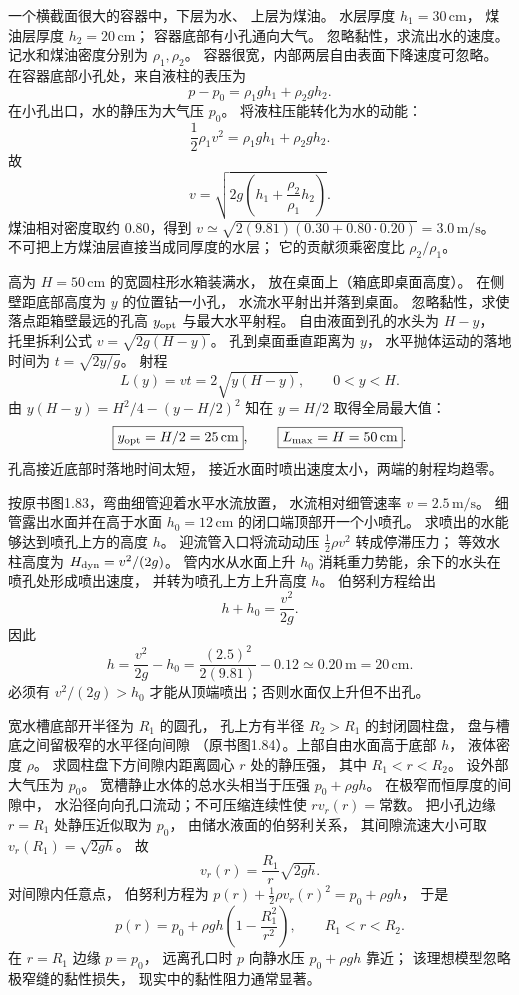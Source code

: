 一个横截面很大的容器中，下层为水、
上层为煤油。
水层厚度 $h_1=30\,\mathrm{cm}$，
煤油层厚度 $h_2=20\,\mathrm{cm}$；
容器底部有小孔通向大气。
忽略黏性，求流出水的速度。
\exsolution
记水和煤油密度分别为 $\rho_1,\rho_2$。
容器很宽，内部两层自由表面下降速度可忽略。
在容器底部小孔处，来自液柱的表压为
\[
p-p_0=\rho_1gh_1+\rho_2gh_2.
\]
在小孔出口，水的静压为大气压 $p_0$。
将液柱压能转化为水的动能：
\[
\frac12\rho_1v^2
=\rho_1gh_1+\rho_2gh_2.
\]
故
\[
\boxed{v=\sqrt{2g\left(
h_1+\frac{\rho_2}{\rho_1}h_2\right)}}.
\]
煤油相对密度取约 $0.80$，得到
$v\simeq\sqrt{2(9.81)(0.30+0.80\cdot0.20)}
=\boxed{3.0\,\mathrm{m/s}}$。
\excheck 不可把上方煤油层直接当成同厚度的水层；
它的贡献须乘密度比 $\rho_2/\rho_1$。

高为 $H=50\,\mathrm{cm}$ 的宽圆柱形水箱装满水，
放在桌面上（箱底即桌面高度）。
在侧壁距底部高度为 $y$ 的位置钻一小孔，
水流水平射出并落到桌面。
忽略黏性，求使落点距箱壁最远的孔高
$y_{\rm opt}$ 与最大水平射程。
\exsolution
自由液面到孔的水头为 $H-y$，
托里拆利公式
$v=\sqrt{2g(H-y)}$。
孔到桌面垂直距离为 $y$，
水平抛体运动的落地时间为
$t=\sqrt{2y/g}$。
射程
\[
L(y)=vt=2\sqrt{y(H-y)},\qquad 0<y<H.
\]
由
$y(H-y)=H^2/4-(y-H/2)^2$
知在 $y=H/2$ 取得全局最大值：
\[
\boxed{y_{\rm opt}=H/2=25\,\mathrm{cm}},\qquad
\boxed{L_{\max}=H=50\,\mathrm{cm}}.
\]
\excheck 孔高接近底部时落地时间太短，
接近水面时喷出速度太小，两端的射程均趋零。

按原书图1.83，弯曲细管迎着水平水流放置，
水流相对细管速率 $v=2.5\,\mathrm{m/s}$。
细管露出水面并在高于水面
$h_0=12\,\mathrm{cm}$ 的闭口端顶部开一个小喷孔。
求喷出的水能够达到喷孔上方的高度 $h$。
\exsolution
迎流管入口将流动动压
$\tfrac12\rho v^2$ 转成停滞压力；
等效水柱高度为
$H_{\rm dyn}=v^2/(2g)$。
管内水从水面上升 $h_0$
消耗重力势能，余下的水头在喷孔处形成喷出速度，
并转为喷孔上方上升高度 $h$。
伯努利方程给出
\[
h+h_0=\frac{v^2}{2g}.
\]
因此
\[
\boxed{h=\frac{v^2}{2g}-h_0
=\frac{(2.5)^2}{2(9.81)}-0.12
\simeq0.20\,\mathrm m=20\,\mathrm{cm}}.
\]
\excheck 必须有 $v^2/(2g)>h_0$
才能从顶端喷出；否则水面仅上升但不出孔。

宽水槽底部开半径为 $R_1$ 的圆孔，
孔上方有半径 $R_2>R_1$ 的封闭圆柱盘，
盘与槽底之间留极窄的水平径向间隙
（原书图1.84）。上部自由水面高于底部 $h$，
液体密度 $\rho$。
求圆柱盘下方间隙内距离圆心 $r$ 处的静压强，
其中 $R_1<r<R_2$。
\exsolution
设外部大气压为 $p_0$。
宽槽静止水体的总水头相当于压强
$p_0+\rho gh$。
在极窄而恒厚度的间隙中，
水沿径向向孔口流动；不可压缩连续性使
$r v_r(r)=$常数。
把小孔边缘 $r=R_1$ 处静压近似取为 $p_0$，
由储水液面的伯努利关系，
其间隙流速大小可取
$v_r(R_1)=\sqrt{2gh}$。
故
\[
v_r(r)=\frac{R_1}{r}\sqrt{2gh}.
\]
对间隙内任意点，
伯努利方程为
$p(r)+\tfrac12\rho v_r(r)^2=p_0+\rho gh$，
于是
\[
\boxed{p(r)=p_0+\rho gh
\left(1-\frac{R_1^2}{r^2}\right)},
\qquad R_1<r<R_2.
\]
\excheck 在 $r=R_1$ 边缘 $p=p_0$，
远离孔口时 $p$ 向静水压 $p_0+\rho gh$ 靠近；
该理想模型忽略极窄缝的黏性损失，
现实中的黏性阻力通常显著。


